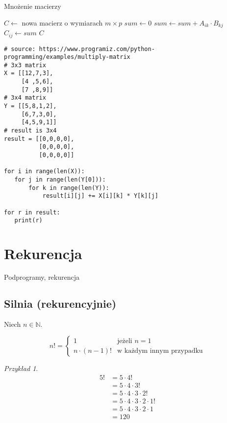 \documentclass[10pt, oneside]{article}
\theoremstyle{remark}
\newtheorem*{example}{Przykład}
\begin{document}
\begin{algorithm}
    \caption{Mnożenie macierzy}
    \label{matmul}
    \begin{algorithmic}[1] %
            \State $C \gets $ nowa macierz o wymiarach $m \times p$
            			\State $sum \gets 0$
            				\State $sum \gets sum + A_{ik}\cdot B_{kj}$
	             	\EndFor
	             	\State $C_{ij} \gets sum$
	            	\EndFor
            	\EndFor
            \State \Return $C$
        \EndFunction
    \end{algorithmic}
\end{algorithm}

\begin{verbatim}
# source: https://www.programiz.com/python-programming/examples/multiply-matrix
# 3x3 matrix
X = [[12,7,3],
     [4 ,5,6],
     [7 ,8,9]]
# 3x4 matrix
Y = [[5,8,1,2],
     [6,7,3,0],
     [4,5,9,1]]
# result is 3x4
result = [[0,0,0,0],
          [0,0,0,0],
          [0,0,0,0]]

for i in range(len(X)):
   for j in range(len(Y[0])):
       for k in range(len(Y)):
           result[i][j] += X[i][k] * Y[k][j]

for r in result:
   print(r)
\end{verbatim}


\section{Rekurencja}

Podprogramy, rekurencja

\subsection{Silnia (rekurencyjnie)}
Niech $n \in \mathbb{N}$.

\begin{equation*}
n! = \begin{cases}
1 &\text{jeżeli $n =1 $}\\
n\cdot (n-1)! &\text{w każdym innym przypadku}
\end{cases}
\end{equation*}

\begin{example}

\begin{align*}
5! &= 5 \cdot 4! \\
&= 5 \cdot 4 \cdot 3! \\  
&= 5 \cdot 4 \cdot 3 \cdot 2! \\  
&= 5 \cdot 4 \cdot 3 \cdot 2 \cdot 1! \\
&= 5 \cdot 4 \cdot 3 \cdot 2 \cdot 1 \\
&= 120
\end{align*}

\end{example}
\end{document}
